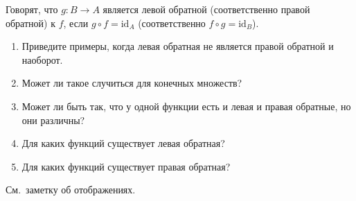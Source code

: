 \documentclass[a4paper,12pt,twoside]{article}
\begin{document}
\begin{?}
    Говорят, что $g \colon B \to A$ является левой обратной (соответственно правой обратной) к $f$, если $g \circ f = \mathrm{id}_{A}$ (соответственно $f \circ g = \mathrm{id}_{B}$).
    \begin{enumerate}[noitemsep, topsep=0pt, parsep=0pt]
        \item Приведите примеры, когда левая обратная не является правой обратной и наоборот.
        \item Может ли такое случиться для конечных множеств?
        \item Может ли быть так, что у одной функции есть и левая и правая обратные, но они различны?
        \item Для каких функций существует левая обратная?
        \item Для каких функций существует правая обратная? 
    \end{enumerate}
\end{?}
\begin{solution}{}
    См{.}~заметку об отображениях. 
\end{solution}
\end{document}
